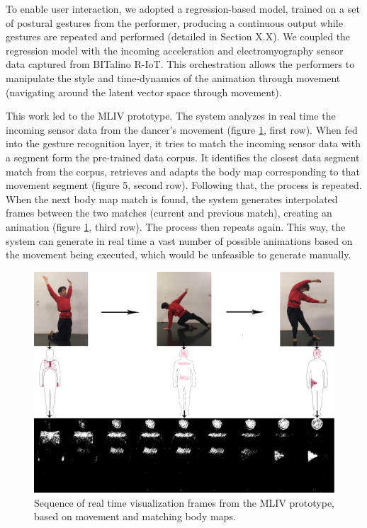 To enable user interaction, we adopted a regression-based model, trained on a set of postural gestures from the performer, producing a continuous output while gestures are repeated and performed (detailed in Section X.X). We coupled the regression model with the incoming acceleration and electromyography sensor data captured from BITalino R-IoT. This orchestration allows the performers to manipulate the style and time-dynamics of the animation through movement (navigating around the latent vector space through movement).

This work led to the MLIV prototype. The system analyzes in real time the incoming sensor data from the dancer’s movement (figure \ref{fig:ml-screenshot}, first row). When fed into the gesture recognition layer, it tries to match the incoming sensor data with a segment form the pre-trained data corpus. It identifies the closest data segment match from the corpus, retrieves and adapts the body map corresponding to that movement segment (figure 5, second row). Following that, the process is repeated. When the next body map match is found, the system generates interpolated frames between the two matches (current and previous match), creating an animation (figure \ref{fig:ml-screenshot}, third row). The process then repeats again. This way, the system can generate in real time a vast number of possible animations based on the movement being executed, which would be unfeasible to generate manually.

\begin{figure}[ht]
  \centering
  \includegraphics[width=\linewidth]{Chapters/Figures/modi_dis/sensor-drawing-3rows-large.png}
  \caption{Sequence of real time visualization frames from the MLIV prototype, based on movement and matching body maps.}
    \label{fig:ml-screenshot}
\end{figure}

